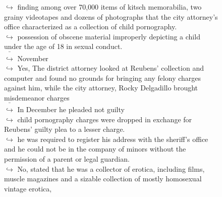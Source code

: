 \documentclass[11pt,a4paper, onecolumn]{article}
\begin{document}
\begin{figure}[t] \small \begin{tcolorbox}[boxsep=0pt,left=5pt,right=0pt,top=2pt,colback = yellow!5] \begin{dialogue}
 \small 
\colorbox{pink!25}{$\hookrightarrow$}
{ finding among over 70,000 items of kitsch memorabilia, two grainy videotapes and dozens of photographs that the city attorney's office characterized as a collection of child pornography. }
\\
\colorbox{pink!25}{$\hookrightarrow$}
{ possession of obscene material improperly depicting a child under the age of 18 in sexual conduct. }
\\
\colorbox{pink!25}{ $\bar{\hookrightarrow}$}
{ November }
\\
\colorbox{pink!25}{$\hookrightarrow$}
\colorbox{red!25}{Yes,}
{ The district attorney looked at Reubens' collection and computer and found no grounds for bringing any felony charges against him, while the city attorney, Rocky Delgadillo brought misdemeanor charges }
\\
\colorbox{pink!25}{ $\bar{\hookrightarrow}$}
{ In December he pleaded not guilty }
\\
\colorbox{pink!25}{$\hookrightarrow$}
{ child pornography charges were dropped in exchange for Reubens' guilty plea to a lesser charge. }
\\
\colorbox{pink!25}{$\hookrightarrow$}
{ he was required to register his address with the sheriff's office and he could not be in the company of minors without the permission of a parent or legal guardian. }
\\
\colorbox{pink!25}{$\hookrightarrow$}
\colorbox{red!25}{No,}
{ stated that he was a collector of erotica, including films, muscle magazines and a sizable collection of mostly homosexual vintage erotica, }
 \end{dialogue}\end{tcolorbox}\end{figure}
\end{document}

